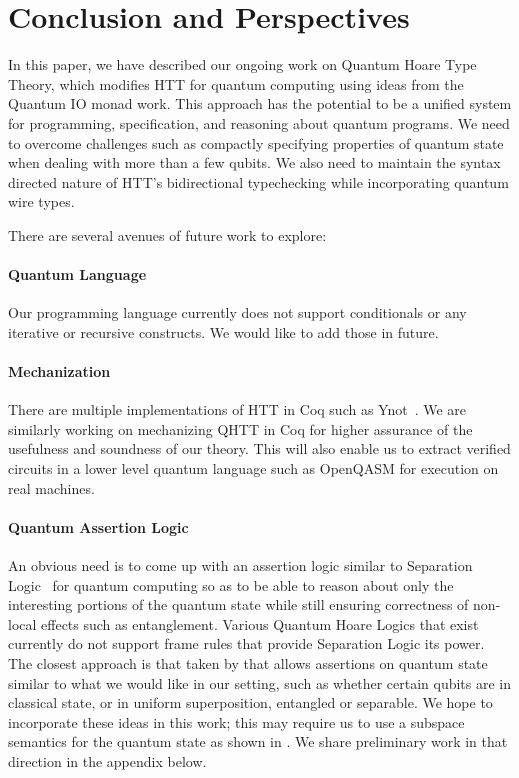 \documentclass[acmsmall,nonacm,timestamp,review=false,anonymous=false]{acmart}
\begin{document}

\section{Conclusion and Perspectives}
\label{sec:conclusion}
In this paper, we have described our ongoing work on Quantum Hoare Type Theory, which modifies HTT for quantum computing using ideas from the Quantum IO monad work. This approach has the potential to be a unified system for programming, specification, and reasoning about quantum programs. We need to overcome challenges such as compactly specifying properties of quantum state when dealing with more than a few qubits. We also need to maintain the syntax directed nature of HTT's bidirectional typechecking while incorporating quantum wire types.

There are several avenues of future work to explore:

\paragraph{Quantum Language} Our programming language currently does not support conditionals or any iterative or recursive constructs. We would like to add those in future.

\paragraph{Mechanization} There are multiple implementations of HTT in Coq such as Ynot~\cite{ynot2008}. We are similarly working on mechanizing QHTT in Coq for higher assurance of the usefulness and soundness of our theory. This will also enable us to extract verified circuits in a lower level quantum language such as OpenQASM for execution on real machines.

\paragraph{Quantum Assertion Logic} An obvious need is to come up with an assertion logic similar to Separation Logic~\cite{reynolds2002} for quantum computing so as to be able to reason about only the interesting portions of the quantum state while still ensuring correctness of non-local effects such as entanglement. Various Quantum Hoare Logics that exist~\cite{ying_floydhoare_2012} currently do not support frame rules that provide Separation Logic its power. The closest approach is that taken by \citet{unruh2019} that allows assertions on quantum state similar to what we would like in our setting, such as whether certain qubits are in classical state, or in uniform superposition, entangled or separable. We hope to incorporate these ideas in this work; this may require us to use a subspace semantics for the quantum state as shown in \citet{unruh2019}. We share preliminary work in that direction in the appendix below.
\end{document}
